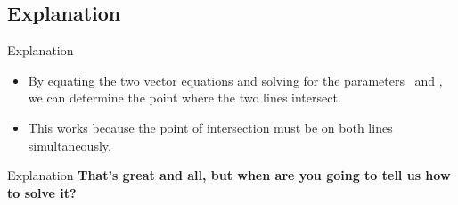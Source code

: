 \subsection{Explanation}
\frame{\subsectionpage}
\begin{frame}{Explanation}
    \begin{itemize}
        \item<2->{By equating the two vector equations and solving for the parameters \begingroup{}\endgroup \ and \begingroup{}\endgroup , we can determine the point where the two lines intersect.}
        \item<3->{This works because the point of intersection must be on both lines simultaneously.}
    \end{itemize}
\end{frame}
\begin{frame}{Explanation}
    \textbf{That's great and all, but when are you going to tell us how to solve it?} \\
\end{frame}
